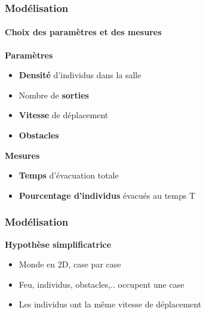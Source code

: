 \documentclass{beamer}
\begin{document}


\begin{frame}
	\frametitle{Modélisation}
	\framesubtitle{Choix des paramètres et des mesures}
	\begin{block}{\textbf{Paramètres}}
	\begin{itemize}
		\medskip
		\item \textbf{Densité} d'individus dans la salle\\
		\item Nombre de \textbf{sorties}\\
		\item \textbf{Vitesse} de déplacement\\
		\item \textbf{Obstacles}\\
	\end{itemize}
	\end{block}
	
	\bigskip
	
	\begin{block}{\textbf{Mesures}}
	\begin{itemize}
		\medskip
		\item \textbf{Temps} d'évacuation totale \\
		\item \textbf{Pourcentage d'individus} évacués au temps T\\
	\end{itemize}
	\end{block}
\end{frame}

\begin{frame}
	\frametitle{Modélisation}
	\begin{block}{\textbf{Hypothèse simplificatrice}}
	\medskip
	\begin{itemize}
		\item Monde en 2D, case par case 
		\item Feu, individus, obstacles,.. occupent une case
		\item Les individus ont la même vitesse de déplacement 
	\end{itemize}
	\end{block}
\end{frame}
\end{document}

